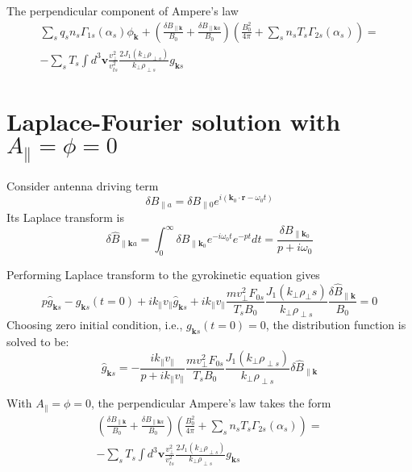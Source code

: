 \documentclass[12pt]{article}
\begin{document}
The perpendicular component of Ampere's law
\begin{equation}
\begin{split}
\sum_s q_s n_s \Gamma_{1s}(\alpha_s) \phi_\mathbf{k} + \left( \frac{\delta B_{\parallel \mathbf{k}}}{B_0} + \frac{\delta B_{\parallel \mathbf{k}a}}{B_0}\right) \left( \frac{B_0^2}{4\pi} + \sum_s n_sT_s\Gamma_{2s}(\alpha_s)\right) = \\
-\sum_s T_s \int d^3\mathbf{v} \frac{v_\perp^2}{v_{ts}^2}\frac{2J_1(k_\perp \rho_{\perp s})}{k_\perp \rho_{\perp s}} g_{\mathbf{k}s}
\end{split}
\end{equation}

\section{Laplace-Fourier solution with $A_\parallel=\phi = 0$}
\label{sec:apar=phi=0}

Consider antenna driving term
\begin{equation}
\delta B_{\parallel a} = \delta B_{\parallel 0} e^{i(\mathbf{k}_0\cdot \mathbf{r} - \omega_0 t)}
\label{eq:driving_b}
\end{equation}
Its Laplace transform is
\begin{equation}
\delta\hat{B}_{\parallel \mathbf{k} a} = \int_0^\infty  \delta B_{\parallel \mathbf{k}_0} e^{-i\omega_0 t} e^{-pt} dt = \frac{ \delta B_{\parallel \mathbf{k}_0}}{p+i\omega_0}
\label{eq:driving_b_LT}
\end{equation}

Performing Laplace transform to the gyrokinetic equation gives
%
\begin{equation}
p\hat{g}_{\mathbf{k}s} -g_{\mathbf{k}s}(t=0) + ik_\parallel v_\parallel \hat{g}_{\mathbf{k}s} + ik_\parallel v_\parallel \frac{mv_\perp^2 F_{0s}}{T_s B_0} \frac{J_1(k_\perp \rho_\perp s)}{k_\perp \rho_{\perp s}} \frac{\delta \hat{B}_{\parallel \mathbf{k}}}{B_0} = 0
\end{equation}
%
Choosing zero initial condition, i.e., $g_{\mathbf{k}s}(t=0)=0$, the distribution function is solved to be:
%
\begin{equation}
\hat{g}_{\mathbf{k}s} =- \frac{ik_\parallel v_\parallel}{p + ik_\parallel v_\parallel} \frac{mv_\perp^2 F_{0s}}{T_s B_0} \frac{J_1(k_\perp \rho_{\perp s})}{k_\perp \rho_{\perp s}} \delta \hat{B}_{\parallel \mathbf{k}} 
\label{eqn:gks}
\end{equation}

With $A_\parallel = \phi=0$, the perpendicular Ampere's law takes the form
\begin{equation}
\begin{split}
 \left( \frac{\delta B_{\parallel \mathbf{k}}}{B_0} + \frac{\delta B_{\parallel \mathbf{k}a}}{B_0}\right) \left( \frac{B_0^2}{4\pi} + \sum_s n_sT_s\Gamma_{2s}(\alpha_s)\right) = \\
 -\sum_s T_s \int d^3\mathbf{v} \frac{v_\perp^2}{v_{ts}^2}\frac{2J_1(k_\perp \rho_{\perp s})}{k_\perp \rho_{\perp s}} g_{\mathbf{k}s}
 \end{split}
 \label{eq:perp_ampere_1}
\end{equation}
\end{document}
